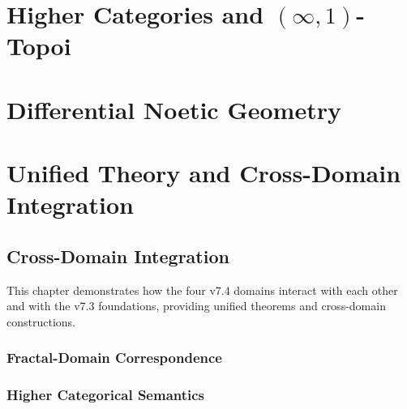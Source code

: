 \documentclass[11pt,twoside,openright]{book}
\theoremstyle{definition}
\theoremstyle{plain}
\theoremstyle{remark}
\begin{document}


\part{Higher Categories and $(\infty,1)$-Topoi}
\label{part:higher-categories}



\part{Differential Noetic Geometry}
\label{part:noetic-geometry}



\part{Unified Theory and Cross-Domain Integration}
\label{part:unified}

\chapter{Cross-Domain Integration}
\label{ch:cross-domain}

\begin{tcolorbox}[colback=green!5!white,colframe=green!75!black,title=\textbf{Integration Chapter}]
This chapter demonstrates how the four v7.4 domains interact with each other and with the v7.3 foundations, providing unified theorems and cross-domain constructions.
\end{tcolorbox}

\section{Fractal-Domain Correspondence}

\section{Higher Categorical Semantics}
\end{document}
